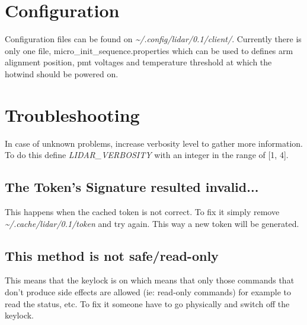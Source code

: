 \documentclass[letterpaper, 10 pt]{article}
\begin{document}
\section{Configuration}
Configuration files can be found on \textit{\~{}/.config/lidar/0.1/client/}. Currently there is only one file, micro\_init\_sequence.properties which can be used to defines arm alignment position, pmt voltages and temperature threshold at which the hotwind should be powered on.

\section{Troubleshooting}
In case of unknown problems, increase verbosity level to gather more information. To do this define \emph{LIDAR\_VERBOSITY} with an integer in the range of [1, 4].
\subsection{The Token's Signature resulted invalid...}
This happens when the cached token is not correct. To fix it simply remove \textit{\~{}/.cache/lidar/0.1/token} and try again. This way a new token will be generated.\\
\subsection{This method is not safe/read-only}
This means that the keylock is on which means that only those commands that don't produce side effects are allowed (ie: read-only commands) for example to read the status, etc. To fix it someone have to go physically and switch off the keylock.


\newpage

%
\end{document}
